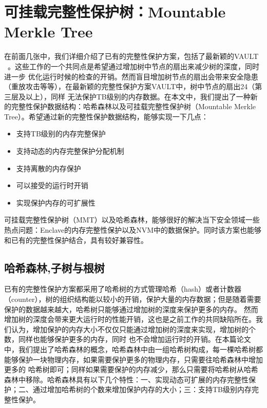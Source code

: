 \chapter{可挂载完整性保护树：Mountable Merkle Tree}

在前面几张中，我们详细介绍了已有的完整性保护方案，包括了最新颖的VAULT ~\cite{taassori2018vault}。这些工作的一个共同点是希望通过增加树中节点的扇出来减少树的深度，同时进一步
优化运行时候的检查的开销。然而盲目增加树节点的扇出会带来安全隐患（重放攻击等等），在最新颖的完整性保护方案VAULT中，树中节点的扇出24（第三层及以上），同样
无法保护TB级别的内存数据。在本文中，我们提出了一种新的完整性保护数据结构：哈希森林以及可挂载完整性保护树（Mountable Merkle Tree）。希望通过新的完整性保护数据结构，能够实现一下几点：
\begin{itemize}
    \item 支持TB级别的内存完整保护
    \item 支持动态的内存完整保护分配机制
    \item 支持离散的内存保护
    \item 可以接受的运行时开销
    \item 实现保护内存的可扩展性
\end{itemize}
可挂载完整性保护树（MMT）以及哈希森林，能够很好的解决当下安全领域一些热点问题：Enclave的内存完整性保护以及NVM中的数据保护。同时该方案也能够和已有的完整性保护结合，具有较好兼容性。

\section{哈希森林,子树与根树}
已有的完整性保护方案都采用了哈希树的方式管理哈希（hash）或者计数器（counter），树的组织结构能以较小的开销，保护大量的内存数据；但是随着需要保护的数据越来越大，哈希树只能够通过增加树的深度来保护更多的内存。
然而增加树的深度会带来更大运行时的性能开销，这也是之前工作的共同缺陷所在。我们认为，增加保护的内存大小不仅仅只能通过增加树的深度来实现，增加树的个数，同样也能够保护更多的内存，同时
也不会增加运行时的开销。在本篇论文中，我们提出了哈希森林的概念，哈希森林中由一组哈希树构成，每一棵哈希树都能够保护一块物理内存，如果需要保护更多的物理内存，只需要往哈希森林中增加更多的
哈希树即可；同样如果需要保护的内存减少，那么只需要将哈希树从哈希森林中移除。哈希森林具有以下几个特性：一、实现动态可扩展的内存完整性保护；二、通过增加哈希树的个数来增加保护内存的大小；三：支持TB级别内存完整性保护。

